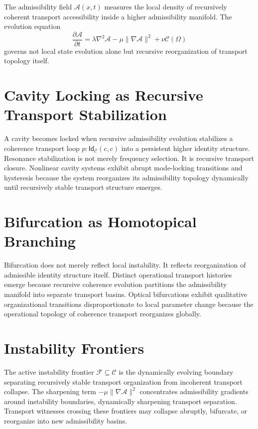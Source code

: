 \documentclass[11pt,openany]{book}
\theoremstyle{definition}
\theoremstyle{plain}
\newcommand{\idtype}{\mathsf{Id}}
\newcommand{\Afield}{\mathcal{A}}
\newcommand{\Cfield}{\mathcal{C}}
\newcommand{\Ffrontier}{\mathcal{F}}
\begin{document}
The admissibility field $\Afield(x,t)$ measures the local density of recursively coherent transport accessibility inside a higher admissibility manifold. The evolution equation
\[
\frac{\partial \Afield}{\partial t}
=
\lambda \nabla^2 \Afield
-
\mu \|\nabla \Afield\|^2
+
\nu \Cfield(\Omega)
\]
governs not local state evolution alone but recursive reorganization of transport topology itself.

\section{Cavity Locking as Recursive Transport Stabilization}

A cavity becomes locked when recursive admissibility evolution stabilizes a coherence transport loop $p : \idtype_{\mathcal{C}}(c,c)$ into a persistent higher identity structure. Resonance stabilization is not merely frequency selection. It is recursive transport closure. Nonlinear cavity systems exhibit abrupt mode-locking transitions and hysteresis because the system reorganizes its admissibility topology dynamically until recursively stable transport structure emerges.

\section{Bifurcation as Homotopical Branching}

Bifurcation does not merely reflect local instability. It reflects reorganization of admissible identity structure itself. Distinct operational transport histories emerge because recursive coherence evolution partitions the admissibility manifold into separate transport basins. Optical bifurcations exhibit qualitative organizational transitions disproportionate to local parameter change because the operational topology of coherence transport reorganizes globally.

\section{Instability Frontiers}

The active instability frontier $\Ffrontier \subseteq \mathcal{C}$ is the dynamically evolving boundary separating recursively stable transport organization from incoherent transport collapse. The sharpening term $-\mu \|\nabla \Afield\|^2$ concentrates admissibility gradients around instability boundaries, dynamically sharpening transport separation. Transport witnesses crossing these frontiers may collapse abruptly, bifurcate, or reorganize into new admissibility basins.
\end{document}
